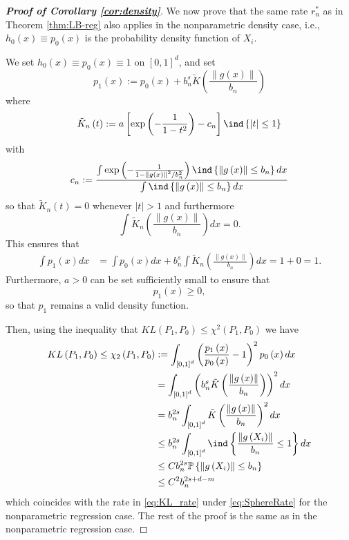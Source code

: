 \documentclass[12pt,american]{article}
\theoremstyle{definition}
\theoremstyle{plain}
\theoremstyle{definition}
\theoremstyle{plain}
\theoremstyle{plain}
\theoremstyle{plain}
\theoremstyle{plain}
\theoremstyle{plain}
\newcommand{\norm}[1]{\left\| #1 \right\|}
\begin{document}
\begin{proof}[\textbf{Proof of Corollary \ref{cor:density}}]
We now prove that the same rate $r^*_n$ as in Theorem \ref{thm:LB-reg} also applies in the nonparametric density case, i.e., $h_0(x) \equiv p_0(x)$ is the probability density function of $X_i$.

We set $h_{0}\left(x\right)\equiv p_{0}\left(x\right)\equiv1$ on
$\left[0,1\right]^{d}$, and set
\[
p_{1}\left(x\right):=p_{0}\left(x\right)+b_{n}^{s}\tilde{K}\left(\frac{\norm{g\left(x\right)}}{b_{n}}\right)
\]
where
\[
\tilde{K}_{n}\left(t\right):=a\left[\exp\left(-\frac{1}{1-t^{2}}\right)-c_{n}\right]\ind\left\{ \left|t\right|\leq1\right\}
\]
with
\[
c_{n}:=\frac{\int\exp\left(-\frac{1}{1-\norm{g\left(x\right)}^2/b_{n}^2}\right)\ind\left\{ \norm{g\left(x\right)}\leq b_{n}\right\} dx}{\int\ind\left\{ \norm{g\left(x\right)}\leq b_{n}\right\} dx}
\]
so that $\tilde{K}_{n}\left(t\right)=0$ whenever $\left|t\right|>1$
and furthermore
\[
\int\tilde{K}_{n}\left(\frac{\norm{g\left(x\right)}}{b_{n}}\right)dx=0.
\]
This ensures that
\begin{align*}
\int p_{1}\left(x\right)dx & =\int p_{0}\left(x\right)dx+b_{n}^{s}\int\tilde{K}_{n}\left(\frac{\norm{g\left(x\right)}}{b_{n}}\right)dx=1+0=1.
\end{align*}
Furthermore, $a>0$ can be set sufficiently small to ensure that
\[
p_{1}\left(x\right)\geq0,
\]
so that $p_{1}$ remains a valid density function.

Then, using the inequality that $ KL(P_1,P_0) \leq \chi
^2(P_1,P_0)$ we have
\begin{align}
KL\left(P_{1},P_{0}\right)\leq\chi_{2}\left(P_{1},P_{0}\right) & :=\int_{\left[0,1\right]^{d}}\left(\frac{p_{1}\left(x\right)}{p_{0}\left(x\right)}-1\right)^{2}p_{0}\left(x\right)dx\nonumber \\
 & =\int_{\left[0,1\right]^{d}}\left(b_{n}^{s}\tilde{K}\left(\frac{\norm{g\left(x\right)}}{b_{n}}\right)\right)^{2}dx\nonumber \\
 & =b_{n}^{2s}\int_{\left[0,1\right]^{d}}\tilde{K}\left(\frac{\norm{g\left(x\right)}}{b_{n}}\right)^{2}dx\nonumber \\
 & \leq b_{n}^{2s}\int_{\left[0,1\right]^{d}}\ind\left\{ \frac{\norm{g\left(X_{i}\right)}}{b_{n}}\leq1\right\} dx\nonumber \\
 & \leq Cb_{n}^{2s}\P\left\{ \norm{g\left(X_{i}\right)}\leq b_{n}\right\} \nonumber \\
 & \leq C^{2}b_{n}^{2s+d-m}\label{eq:Chi2_Rate}
\end{align}
which coincides with the rate in \eqref{eq:KL_rate} under \eqref{eq:SphereRate}
for the nonparametric regression case. The rest of the proof is the
same as in the nonparametric regression case.
\end{proof}
\end{document}
